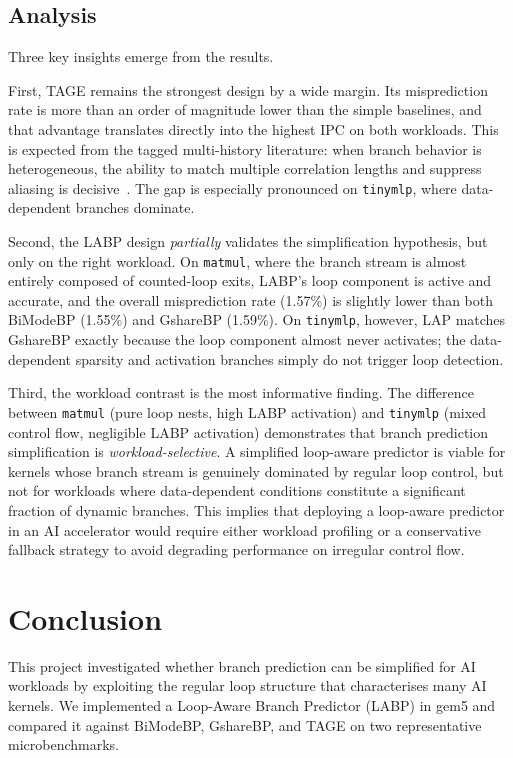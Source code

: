\documentclass[conference]{IEEEtran}
\begin{document}
\subsection{Analysis}

Three key insights emerge from the results.

First, TAGE remains the strongest design by a wide margin. Its misprediction rate is more than an order of magnitude lower than the simple baselines, and that advantage translates directly into the highest IPC on both workloads. This is expected from the tagged multi-history literature: when branch behavior is heterogeneous, the ability to match multiple correlation lengths and suppress aliasing is decisive~\cite{michaud_2005,seznec_michaud_2006,seznec_2016}. The gap is especially pronounced on \texttt{tinymlp}, where data-dependent branches dominate.

Second, the LABP design \emph{partially} validates the simplification hypothesis, but only on the right workload. On \texttt{matmul}, where the branch stream is almost entirely composed of counted-loop exits, LABP's loop component is active and accurate, and the overall misprediction rate (1.57\%) is slightly lower than both BiModeBP (1.55\%) and GshareBP (1.59\%). On \texttt{tinymlp}, however, LAP matches GshareBP exactly because the loop component almost never activates; the data-dependent sparsity and activation branches simply do not trigger loop detection.

Third, the workload contrast is the most informative finding. The difference between \texttt{matmul} (pure loop nests, high LABP activation) and \texttt{tinymlp} (mixed control flow, negligible LABP activation) demonstrates that branch prediction simplification is \emph{workload-selective}. A simplified loop-aware predictor is viable for kernels whose branch stream is genuinely dominated by regular loop control, but not for workloads where data-dependent conditions constitute a significant fraction of dynamic branches. This implies that deploying a loop-aware predictor in an AI accelerator would require either workload profiling or a conservative fallback strategy to avoid degrading performance on irregular control flow.

\section{Conclusion}

This project investigated whether branch prediction can be simplified for AI workloads by exploiting the regular loop structure that characterises many AI kernels. We implemented a Loop-Aware Branch Predictor (LABP) in gem5 and compared it against BiModeBP, GshareBP, and TAGE on two representative microbenchmarks.
\end{document}
